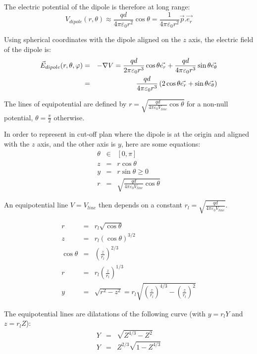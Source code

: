 \documentclass[a4paper,10pt]{article}
\newcommand{\vE}{\ensuremath\vec{E}} %
\begin{document}
The electric potential of the dipole is therefore at long range:
\begin{equation}
  V_{dipole}(r, \theta) \approx \frac{qd}{4 \pi \varepsilon_0 r^2}\cos\theta = \frac{1}{4 \pi \varepsilon_0 r^2}\vec{p}.\vec{e_r}
\end{equation}

Using spherical coordinates with the dipole aligned on the $z$ axis, the electric field of the dipole is:
\begin{eqnarray}
  \vE_{dipole}(r, \theta, \varphi) &=& -\nabla V = \frac{qd}{2 \pi \varepsilon_0 r^3}\cos\theta \vec{e_r} + \frac{qd}{4 \pi \varepsilon_0 r^3}\sin\theta \vec{e_\theta} \\
    &=& \frac{qd}{4 \pi \varepsilon_0 r^3} \left(2\cos\theta \vec{e_r} + \sin\theta \vec{e_\theta}\right)
\end{eqnarray}

The lines of equipotential are defined by $r = \sqrt{\frac{qd}{4 \pi \varepsilon_0 V_{line}}\cos\theta}$ for a non-null potential, $\theta = \frac{\pi}{2}$ otherwise.

In order to represent in cut-off plan where the dipole is at the origin and aligned with the $z$ axis, and the other axis is $y$, here are some equations:
\begin{eqnarray}
  \theta &\in& [0, \pi] \\
  z &=& r \cos\theta \\
  y &=& r \sin\theta \geq 0 \\
  r &=& \sqrt{\frac{qd}{4 \pi \varepsilon_0 V_{line}}\cos\theta}
\end{eqnarray}

An equipotential line $V = V_{line}$ then depends on a constant $r_l = \sqrt{\frac{qd}{4 \pi \varepsilon_0 V_{line}}}$.

\begin{eqnarray}
  r &=& r_l \sqrt{\cos\theta} \\
  z &=& r_l (\cos\theta)^{3/2} \\
  \cos\theta &=& \left(\frac{z}{r_l}\right)^{2/3} \\
  r &=& r_l \left(\frac{z}{r_l}\right)^{1/3} \\
  y &=& \sqrt{r^2 - z^2} = r_l \sqrt{\left(\frac{z}{r_l}\right)^{4/3} - \left(\frac{z}{r_l}\right)^2}
\end{eqnarray}

The equipotential lines are dilatations of the following curve (with $y = r_l Y$ and $z = r_l Z$):
\begin{eqnarray}
  Y &=& \sqrt{Z^{4/3} - Z^2} \\
  Y &=& Z^{2/3} \sqrt{1 - Z^{4/3}}
\end{eqnarray}
\end{document}
